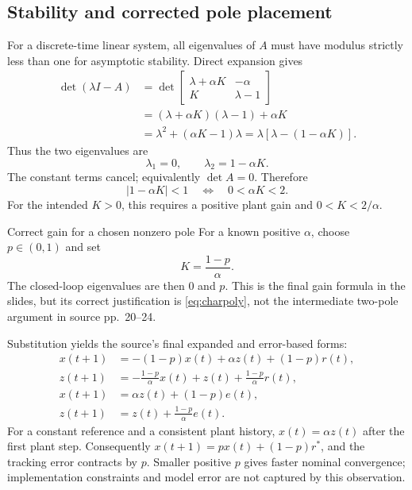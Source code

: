 \documentclass[11pt,a4paper]{article}
\numberwithin{equation}{section}
\numberwithin{figure}{section}
\numberwithin{table}{section}
\begin{document}
\subsection{Stability and corrected pole placement}\label{sec:poles}
For a discrete-time linear system, all eigenvalues of $A$ must have modulus strictly less than one for asymptotic stability. Direct expansion gives
\begin{align}
\det(\lambda I-A)
&=\det\begin{bmatrix}\lambda+\alpha K&-\alpha\\K&\lambda-1\end{bmatrix}\nonumber\\
&=(\lambda+\alpha K)(\lambda-1)+\alpha K\nonumber\\
&=\lambda^2+(\alpha K-1)\lambda
=\lambda[\lambda-(1-\alpha K)].\label{eq:charpoly}
\end{align}
Thus the two eigenvalues are
\begin{equation}\label{eq:poles}\lambda_1=0,\qquad\lambda_2=1-\alpha K.\end{equation}
The constant terms cancel; equivalently $\det A=0$. Therefore
\begin{equation}\label{eq:gaincondition}|1-\alpha K|<1\quad\Longleftrightarrow\quad0<\alpha K<2.\end{equation}
For the intended $K>0$, this requires a positive plant gain and $0<K<2/\alpha$.

\begin{concept}{Correct gain for a chosen nonzero pole}
For a known positive $\alpha$, choose $p\in(0,1)$ and set
\[K=\frac{1-p}{\alpha}.\]
The closed-loop eigenvalues are then $0$ and $p$. This is the final gain formula in the slides, but its correct justification is \cref{eq:charpoly}, not the intermediate two-pole argument in source pp.\ 20--24.
\end{concept}

Substitution yields the source's final expanded and error-based forms:
\begin{align}
x(t+1)&=-(1-p)x(t)+\alpha z(t)+(1-p)r(t),\\
z(t+1)&=-\frac{1-p}{\alpha}x(t)+z(t)+\frac{1-p}{\alpha}r(t),\\
x(t+1)&=\alpha z(t)+(1-p)e(t),\\
z(t+1)&=z(t)+\frac{1-p}{\alpha}e(t).
\end{align}
For a constant reference and a consistent plant history, $x(t)=\alpha z(t)$ after the first plant step. Consequently $x(t+1)=p x(t)+(1-p)r^*$, and the tracking error contracts by $p$. Smaller positive $p$ gives faster nominal convergence; implementation constraints and model error are not captured by this observation.
\end{document}
